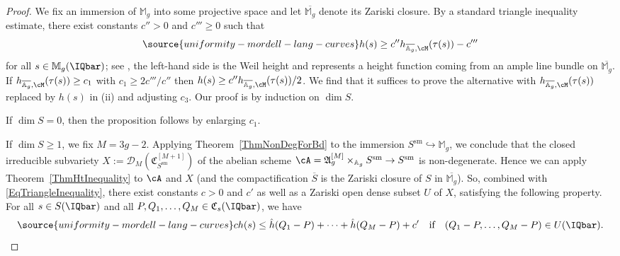 \begin{proof}
  We fix an immersion of $\mathbb{M}_g$ into
  some projective space and let $\overline{\mathbb{M}_g}$ denote its
  Zariski closure.
By a standard triangle inequality estimate, there exist constants
$c''>0$ and $c'''\ge 0$ such that
\begin{equation}\label{EqTriangleInequality}
\source{uniformity-mordell-lang-curves}
h(s) \ge  c'' h_{\overline{\mathbb{A}_g},\cM}(\tau(s)) - c'''
\end{equation}
for all $s \in \mathbb{M}_g(\IQbar)$; see
\cite[Lemma~4]{Silverman:heightest11}, the left-hand side is the Weil
height and represents a height function coming from an ample line
bundle on $\overline{\mathbb{M}_g}$.
If $h_{\overline{\mathbb{A}_g},\cM}(\tau(s))\ge c_1$ with $c_1\ge
2 c'''/c''$
then $h(s) \ge c''
h_{\overline{\mathbb{A}_g},\cM}(\tau(s))/2$. We find that it suffices to
prove the alternative with $h_{\overline{\mathbb{A}_g},\cM}(\tau(s))$
replaced by $h(s)$ in (ii) and adjusting $c_3$.
Our proof is by induction on $\dim S$.

If $\dim S = 0$, then the proposition follows by enlarging $c_1$.

If $\dim S\ge 1$, we fix $M = 3g-2$.
Applying
Theorem~\ref{ThmNonDegForBd} to the immersion
 $S^{\mathrm{sm}} \hookrightarrow \mathbb{M}_g$,
we conclude that the closed irreducible subvariety
 $X:=\mathscr{D}_M(\mathfrak{C}_{S^{\mathrm{sm}}}^{[M+1]})$
of the abelian scheme
$\cA=\mathfrak{A}_g^{[M]}\times_{\mathbb{A}_g} S^{\mathrm{sm}} \rightarrow
S^{\mathrm{sm}}$
is non-degenerate. Hence we can apply Theorem~\ref{ThmHtInequality} to
$\cA$ %
and
$X$
(and the compactification $\overline{S}$ is the Zariski closure of $S$ in $\overline{\mathbb{M}_g}$).
So, combined with \eqref{EqTriangleInequality}, there exist constants
$c > 0$ and $c'$ as well as a Zariski open dense subset $U$ of
$X$,
satisfying the following property.
For all $s \in S(\IQbar)$ and
all $P, Q_1,\ldots,Q_M \in \mathfrak{C}_s(\IQbar)$, we have
\begin{equation}\label{EqHtInequalityBdRatPt}
\source{uniformity-mordell-lang-curves}
c h(s)\le
\hat{h}(Q_1-P) + \cdots + \hat{h}(Q_M - P) + c' \quad
\text{if}\quad (Q_1-P,\ldots, Q_M-P) \in U(\IQbar).
\end{equation}


\end{proof}
